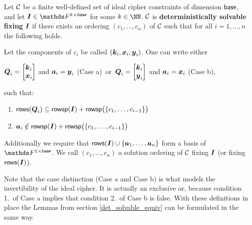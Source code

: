 \begin{defn}
\label{def_det_solvable_ic}
    Let $\mathcal{C}$ be a finite well-defined set of ideal cipher constraints of dimension $\mathsf{base}$,
    and let $\I \in \F^{k \times \base}$ for some $k \in \NN$.
    $\mathcal{C}$ is \textbf{deterministically solvable fixing} $\boldsymbol{I}$
    if there exists an ordering $(c_1, \dots, c_n)$ of $\mathcal{C}$
    such that for all $i=1, \dots, n$ the following holds.
    
    Let the components of $c_i$ be called $(\boldsymbol k_i, \boldsymbol x_i, \boldsymbol y_i)$.
    One can write either
    \vspace{-4mm}
    \begin{center}
    $\boldsymbol{Q}_i = \begin{bmatrix}\boldsymbol k_i \\ \boldsymbol x_i\end{bmatrix}$ and $\boldsymbol a_i = \boldsymbol y_i$ (Case a) \,or\, 
    $\boldsymbol{Q}_i = \begin{bmatrix}\boldsymbol k_i \\ \boldsymbol y_i\end{bmatrix}$ and $\boldsymbol a_i = \boldsymbol x_i$ (Case b),
    \end{center}
    \vspace{-4mm}
    such that:
    
    \begin{enumerate}
    \item
        \label{solvable1_ic}
        $\mathsf{rows}(\boldsymbol{Q}_i) \subseteq \mathsf{rowsp}(\boldsymbol{I}) + \mathsf{rowsp}\big(\{c_1, \dots, c_{i-1}\}\big)$
    \item
        \label{solvable2_ic}
        $\boldsymbol a_i \notin \mathsf{rowsp}(\boldsymbol{I}) + \mathsf{rowsp}\big(\{c_1, \dots, c_{i-1}\}\big)$
    \end{enumerate}
    Additionally we require that $\mathsf{rows}(\boldsymbol{I}) \cup \{\boldsymbol a_1, \dots, \boldsymbol a_n\}$ form a basis of $\F^{1\times\base}$.
    We call $(c_1, \dots, c_n)$ a solution ordering of $\mathcal{C}$ fixing $\boldsymbol{I}$ (or fixing $\mathsf{rows}(\boldsymbol{I})$).
\end{defn}

Note that the case distinction (Case a and Case b) is what models the invertibility of the ideal cipher.
It is actually an exclusive or,
because condition 1.~of Case a implies that condition 2.~of Case b is false.
With these definitions in place the Lemmas from section \ref{det_solvable_equiv} can be formulated in the same way.

